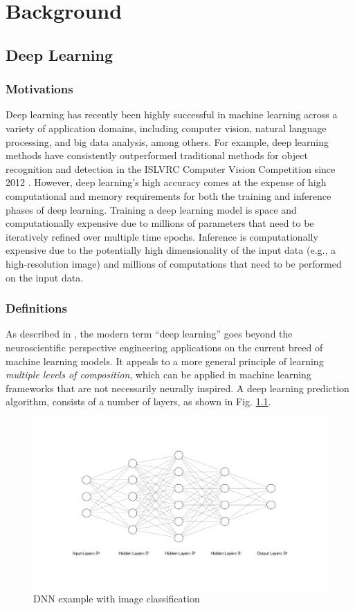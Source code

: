 \chapter{Background} \label{chap:background}

\section{Deep Learning}
\subsection{Motivations}
Deep learning has recently been highly successful in machine learning across a variety of application domains, including computer vision, natural language processing, and big data analysis, among others. For example, deep learning methods have consistently outperformed traditional methods for object recognition and detection in the ISLVRC Computer Vision Competition since 2012 \cite{ILSVRC15}. However, deep learning’s high accuracy comes at the expense of high computational and memory requirements for both the training and inference phases of deep learning. Training a deep learning model is space and computationally expensive due to millions of parameters that need to be iteratively refined over multiple time epochs. Inference is computationally expensive due to the potentially high dimensionality of the input data (e.g., a high-resolution image) and millions of computations that need to be performed on the input data.

\subsection{Definitions}
As described in \cite{Goodfellow-et-al-2016}, the modern term “deep learning” goes beyond the neuroscientific perspective engineering applications on the current breed of machine learning models. It appeals to a more general principle of learning \textit{multiple levels of composition}, which can be applied in machine learning frameworks that are not necessarily neurally inspired.
A deep learning prediction algorithm, consists of a number of layers, as shown in Fig. \ref{fig:dnn}.

\begin{figure}
	\includegraphics[width=\textwidth]{images/nn.png}
	\caption[DNN example]{DNN example with image classification}
	\label{fig:dnn}
\end{figure}


